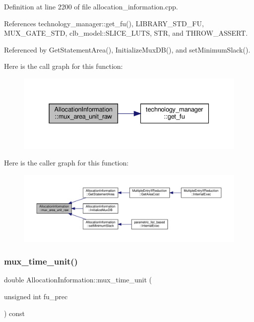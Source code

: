 Definition at line 2200 of file allocation\+\_\+information.\+cpp.



References technology\+\_\+manager\+::get\+\_\+fu(), L\+I\+B\+R\+A\+R\+Y\+\_\+\+S\+T\+D\+\_\+\+FU, M\+U\+X\+\_\+\+G\+A\+T\+E\+\_\+\+S\+TD, clb\+\_\+model\+::\+S\+L\+I\+C\+E\+\_\+\+L\+U\+TS, S\+TR, and T\+H\+R\+O\+W\+\_\+\+A\+S\+S\+E\+RT.



Referenced by Get\+Statement\+Area(), Initialize\+Mux\+D\+B(), and set\+Minimum\+Slack().

Here is the call graph for this function\+:
\nopagebreak
\begin{figure}[H]
\begin{center}
\leavevmode
\includegraphics[width=331pt]{d7/d79/classAllocationInformation_a6a6237d060c2b4300ec143e945c61aff_cgraph}
\end{center}
\end{figure}
Here is the caller graph for this function\+:
\nopagebreak
\begin{figure}[H]
\begin{center}
\leavevmode
\includegraphics[width=350pt]{d7/d79/classAllocationInformation_a6a6237d060c2b4300ec143e945c61aff_icgraph}
\end{center}
\end{figure}
\mbox{\label{classAllocationInformation_a5b11be86fb9ed67e286c657e18a9163a}} 
\subsubsection{\texorpdfstring{mux\+\_\+time\+\_\+unit()}{mux\_time\_unit()}}
{\footnotesize\ttfamily double Allocation\+Information\+::mux\+\_\+time\+\_\+unit (\begin{DoxyParamCaption}\item[{unsigned int}]{fu\+\_\+prec }\end{DoxyParamCaption}) const}



